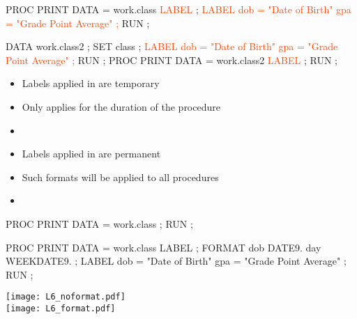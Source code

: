 \begin{frame}[fragile]
\hspace*{-0.3in}
\footnotesize
\begin{code}{.0}
PROC PRINT DATA = work.class \textcolor{OrangeRed}{LABEL} ;
   \textcolor{OrangeRed}{LABEL dob = "Date of Birth"}
         \textcolor{OrangeRed}{gpa = "Grade Point Average" ;}
RUN ;
\end{code}
\footnotesize
\begin{code}{.0}
DATA work.class2 ;
   SET class ;
   \textcolor{OrangeRed}{LABEL dob = "Date of Birth"}
         \textcolor{OrangeRed}{gpa = "Grade Point Average" ;}
RUN ;
PROC PRINT DATA = work.class2 \textcolor{OrangeRed}{LABEL} ;
RUN ;
\end{code}
\emp
{}
\begin{itemize}
\item Labels applied in  are temporary
\item Only applies for the duration of the procedure
\item[]
\item Labels applied in  are permanent
\item Such formats will be applied to all procedures
\item[]
\end{itemize}
\emp
\end{frame}

\begin{frame}[fragile]
\hspace*{-0.3in}
\footnotesize
\begin{code}{.0}
PROC PRINT DATA = work.class ;
RUN ;
\end{code}

\begin{code}{.0}
PROC PRINT DATA = work.class LABEL ;
   FORMAT dob DATE9.
          day WEEKDATE9. ;
   LABEL dob = "Date of Birth"
         gpa = "Grade Point Average" ;
RUN ;
\end{code}
\emp
{} \hspace{1in} \emp
{}
\texttt{[image: L6\_noformat.pdf]}\\
\vskip30pt
\texttt{[image: L6\_format.pdf]}
\emp
\end{frame}

